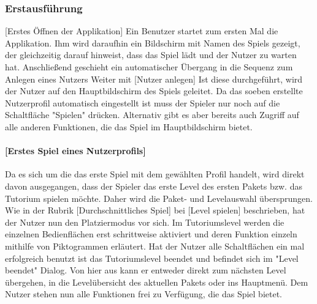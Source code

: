 \subsubsection{Erstausführung}
{[}Erstes Öffnen der Applikation{]}\newline
Ein Benutzer startet zum ersten Mal die Applikation. Ihm wird daraufhin
ein Bildschirm mit Namen des Spiels gezeigt, der gleichzeitig darauf
hinweist, dass das Spiel lädt und der Nutzer zu warten hat.
Anschließend geschieht ein automatischer Übergang in die Sequenz zum
Anlegen eines Nutzers
\newline
\newline
Weiter mit {[}Nutzer anlegen{]}
\newline
\newline
Ist diese durchgeführt, wird der Nutzer auf den Hauptbildschirm des
Spiels geleitet. Da das soeben erstellte Nutzerprofil automatisch eingestellt
ist muss der Spieler nur noch auf die Schaltfläche "Spielen" drücken.
Alternativ gibt es aber bereits auch Zugriff auf alle anderen Funktionen,
die das Spiel im Hauptbildschirm bietet.
\newline
\newline
\paragraph{{[}Erstes Spiel eines Nutzerprofils{]}}
Da es sich um die das erste Spiel mit dem gewählten Profil handelt, wird 
direkt davon ausgegangen, dass der Spieler das erste Level des ersten 
Pakets bzw. das Tutorium spielen möchte. Daher wird die Paket- und Levelauswahl 
übersprungen. Wie in der Rubrik [Durchschnittliches Spiel] bei [Level spielen] 
beschrieben, hat der Nutzer nun den Platziermodus vor sich. Im Tutoriumslevel 
werden die einzelnen Bedienflächen erst schrittweise aktiviert und deren Funktion
einzeln mithilfe von Piktogrammen erläutert. Hat der Nutzer alle Schaltflächen
ein mal erfolgreich benutzt ist das Tutoriumslevel beendet und befindet
sich im "Level beendet" Dialog. Von hier aus kann er entweder direkt zum
nächsten Level übergehen, in die Levelübersicht des aktuellen Pakets oder
ins Hauptmenü.
\newline
\newline
Dem Nutzer stehen nun alle Funktionen frei zu Verfügung, die das Spiel 
bietet.
